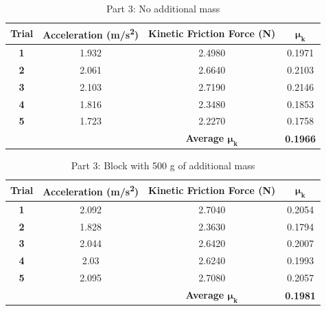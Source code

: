 \begin{table}[H]
	\caption{Part 3: No additional mass}
\centering
\begin{tabular}{cccc} 
\toprule
\textbf{Trial} & \textbf{Acceleration (m/s\textsuperscript{2})} & \textbf{Kinetic Friction Force (N)} & $\boldsymbol{\mu_k}$  \\ 
\toprule
\textbf{1}     & 1.932                                          & 2.4980                              & 0.1971            \\
\textbf{2}     & 2.061                                          & 2.6640                              & 0.2103            \\
\textbf{3}     & 2.103                                          & 2.7190                              & 0.2146            \\
\textbf{4}     & 1.816                                          & 2.3480                              & 0.1853            \\
\textbf{5}     & 1.723                                          & 2.2270                              & 0.1758            \\ 
\toprule
							 &                                                & \textbf{Average $\boldsymbol{\mu_k}$}             & \textbf{0.1966}   \\
\toprule
\end{tabular}
\label{tab:part3block}
\end{table}

 
\begin{table}[H]
	\caption{Part 3: Block with 500 g of additional mass}
\centering
\begin{tabular}{cccc} 
\toprule
\textbf{Trial} & \textbf{Acceleration (m/s\textsuperscript{2})} & \textbf{Kinetic Friction Force (N)} & $\boldsymbol{\mu_k}$  \\ 
\toprule
\textbf{1}     & 2.092                                          & 2.7040                              & 0.2054            \\
\textbf{2}     & 1.828                                          & 2.3630                              & 0.1794            \\
\textbf{3}     & 2.044                                          & 2.6420                              & 0.2007            \\
\textbf{4}     & 2.03                                          & 2.6240                              & 0.1993            \\
\textbf{5}     & 2.095                                          & 2.7080                              & 0.2057            \\ 
\toprule
							 &                                                & \textbf{Average $\boldsymbol{\mu_k}$}             & \textbf{0.1981}   \\
\toprule
\end{tabular}
\label{tab:part3500g}
\end{table}


\newpage


